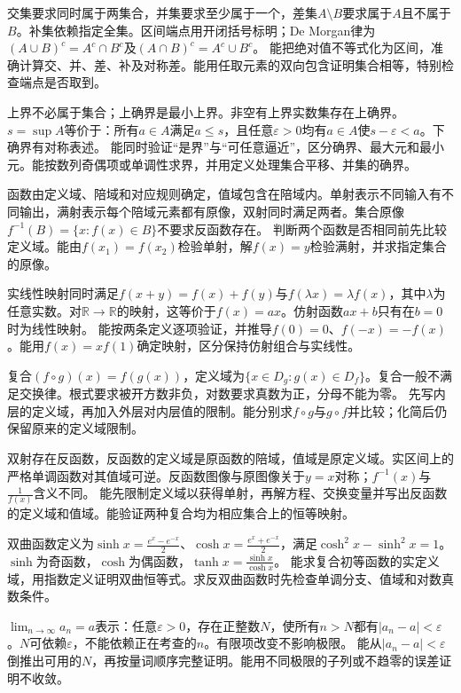 {交集要求同时属于两集合，并集要求至少属于一个，差集$A\setminus B$要求属于$A$且不属于$B$。补集依赖指定全集。区间端点用开闭括号标明；De Morgan律为$(A\cup B)^c=A^c\cap B^c$及$(A\cap B)^c=A^c\cup B^c$。}
{能把绝对值不等式化为区间，准确计算交、并、差、补及对称差。能用任取元素的双向包含证明集合相等，特别检查端点是否取到。}

{上界不必属于集合；上确界是最小上界。非空有上界实数集存在上确界。$s=\sup A$等价于：所有$a\in A$满足$a\le s$，且任意$\varepsilon>0$均有$a\in A$使$s-\varepsilon<a$。下确界有对称表述。}
{能同时验证“是界”与“可任意逼近”，区分确界、最大元和最小元。能按数列奇偶项或单调性求界，并用定义处理集合平移、并集的确界。}

{函数由定义域、陪域和对应规则确定，值域包含在陪域内。单射表示不同输入有不同输出，满射表示每个陪域元素都有原像，双射同时满足两者。集合原像$f^{-1}(B)=\{x:f(x)\in B\}$不要求反函数存在。}
{判断两个函数是否相同前先比较定义域。能由$f(x_1)=f(x_2)$检验单射，解$f(x)=y$检验满射，并求指定集合的原像。}

{实线性映射同时满足$f(x+y)=f(x)+f(y)$与$f(\lambda x)=\lambda f(x)$，其中$\lambda$为任意实数。对$\mathbb R\to\mathbb R$的映射，这等价于$f(x)=ax$。仿射函数$ax+b$只有在$b=0$时为线性映射。}
{能按两条定义逐项验证，并推导$f(0)=0$、$f(-x)=-f(x)$。能用$f(x)=xf(1)$确定映射，区分保持仿射组合与实线性。}

{复合$(f\circ g)(x)=f(g(x))$，定义域为$\{x\in D_g:g(x)\in D_f\}$。复合一般不满足交换律。根式要求被开方数非负，对数要求真数为正，分母不能为零。}
{先写内层的定义域，再加入外层对内层值的限制。能分别求$f\circ g$与$g\circ f$并比较；化简后仍保留原来的定义域限制。}

{双射存在反函数，反函数的定义域是原函数的陪域，值域是原定义域。实区间上的严格单调函数对其值域可逆。反函数图像与原图像关于$y=x$对称；$f^{-1}(x)$与$\frac{1}{f(x)}$含义不同。}
{能先限制定义域以获得单射，再解方程、交换变量并写出反函数的定义域和值域。能验证两种复合均为相应集合上的恒等映射。}

{双曲函数定义为$\sinh x=\frac{e^x-e^{-x}}{2}$、$\cosh x=\frac{e^x+e^{-x}}{2}$，满足$\cosh^2x-\sinh^2x=1$。$\sinh$为奇函数，$\cosh$为偶函数，$\tanh x=\frac{\sinh x}{\cosh x}$。}
{能求复合初等函数的实定义域，用指数定义证明双曲恒等式。求反双曲函数时先检查单调分支、值域和对数真数条件。}

{$\lim_{n\to\infty}a_n=a$表示：任意$\varepsilon>0$，存在正整数$N$，使所有$n>N$都有$|a_n-a|<\varepsilon$。$N$可依赖$\varepsilon$，不能依赖正在考查的$n$。有限项改变不影响极限。}
{能从$|a_n-a|<\varepsilon$倒推出可用的$N$，再按量词顺序完整证明。能用不同极限的子列或不趋零的误差证明不收敛。}

